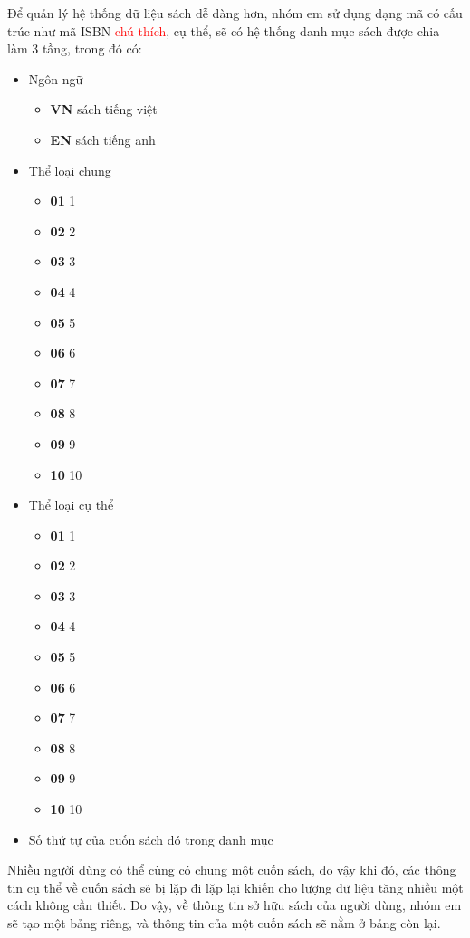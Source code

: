 \documentclass[../thesis.tex]{subfiles}
\begin{document}
\begin{enumerate}
			Để quản lý hệ thống dữ liệu sách dễ dàng hơn, nhóm em sử dụng dạng mã có cấu trúc như mã ISBN \textcolor{red}{chú thích}, cụ thể, sẽ có hệ thống danh mục sách được chia làm 3 tầng, trong đó có:
			\begin{itemize}
				\item Ngôn ngữ
					\begin{itemize}
						\item \textbf{VN} sách tiếng việt
						\item \textbf{EN} sách tiếng anh
					\end{itemize}
				\item Thể loại chung
					\begin{itemize}
						\item \textbf{01} 1
						\item \textbf{02} 2
						\item \textbf{03} 3
						\item \textbf{04} 4
						\item \textbf{05} 5
						\item \textbf{06} 6
						\item \textbf{07} 7
						\item \textbf{08} 8
						\item \textbf{09} 9
						\item \textbf{10} 10
					\end{itemize}
				\item Thể loại cụ thể
					\begin{itemize}
						\item \textbf{01} 1
						\item \textbf{02} 2
						\item \textbf{03} 3
						\item \textbf{04} 4
						\item \textbf{05} 5
						\item \textbf{06} 6
						\item \textbf{07} 7
						\item \textbf{08} 8
						\item \textbf{09} 9
						\item \textbf{10} 10
					\end{itemize}
				\item Số thứ tự của cuốn sách đó trong danh mục
			\end{itemize}
			
			Nhiều người dùng có thể cùng có chung một cuốn sách, do vậy khi đó, các thông tin cụ thể về cuốn sách sẽ bị lặp đi lặp lại khiến cho lượng dữ liệu tăng nhiều một cách không cần thiết. Do vậy, về thông tin sở hữu sách của người dùng, nhóm em sẽ tạo một bảng riêng, và thông tin của một cuốn sách sẽ nằm ở bảng còn lại.
			

\end{enumerate}
\end{document}
